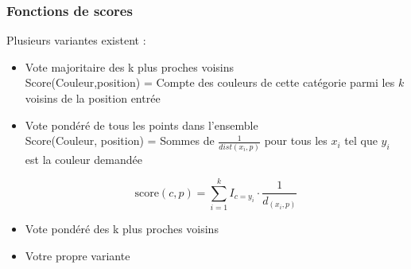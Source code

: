 \documentclass[french]{beamer}
\begin{document}
\begin{frame}
\frametitle{Fonctions de scores}
Plusieurs variantes existent :
\begin{itemize}
\item{Vote majoritaire des k plus proches voisins}\\
Score(Couleur,position) = Compte des couleurs de cette catégorie parmi les $k$ voisins de la position entrée

\item{Vote pondéré de tous les points dans l'ensemble}\\

Score(Couleur, position) = Sommes de $\frac{1}{dist(x_i,p)}$ pour tous les $x_i$ tel que $y_i$ est la couleur demandée

$$\text{score}(c, p) = \sum_{i=1}^k I_{c=y_i} \cdot \frac{1}{d_(x_i,p)}$$
\item{Vote pondéré des k plus proches voisins}\\


\item{Votre propre variante}\\

\end{itemize}

\end{frame}
\end{document}
